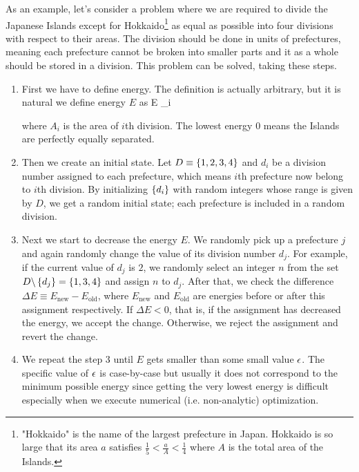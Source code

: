 \documentclass{article}
\theoremstyle{definition}
\begin{document}
As an example, let's consider a problem where we are required to divide the Japanese Islands except for Hokkaido\footnote{"Hokkaido" is the name of the largest prefecture in Japan. Hokkaido is so large that its area $a$ satisfies $\frac{1}{5} < \frac{a}{A} < \frac{1}{4}$ where $A$ is the total area of the Islands.} as equal as possible into four divisions with respect to their areas. The division should be done in units of prefectures, meaning each prefecture cannot be broken into smaller parts and it as a whole should be stored in a division. This problem can be solved, taking these steps.
\begin{enumerate}

\item
First we have to define energy. The definition is actually arbitrary, but it is natural we define energy $E$ as
\begineq
E \equiv \sum _i  
\edeq

where $A_i$ is the area of $i$th division. The lowest energy $0$ means the Islands are perfectly equally separated.

\item
Then we create an initial state. Let $D \equiv \left\{ 1, 2, 3, 4 \right\}$ and $d_i$ be a division number assigned to each prefecture, which means $i$th prefecture now belong to $i$th division. By initializing $\left\{ d_i \right\}$ with random integers whose range is given by $D$, we get a random initial state; each prefecture is included in a random division.

\item
Next we start to decrease the energy $E$. We randomly pick up a prefecture $j$ and again randomly change the value of its division number $d_j$. For example, if the current value of $d_j$ is $2$, we randomly select an integer $n$ from the set $D \backslash \left\{ d_j \right\} = \left\{ 1, 3, 4 \right\}$ and assign $n$ to $d_j$. After that, we check the difference $\Delta E \equiv E_\text{new} - E_\text{old}$, where $E_\text{new}$ and $E_\text{old}$ are energies before or after this assignment respectively. If $\Delta E < 0$, that is, if the assignment has decreased the energy, we accept the change. Otherwise, we reject the assignment and revert the change.

\item
We repeat the step 3 until $E$ gets smaller than some small value $\epsilon$. The specific value of $\epsilon$ is case-by-case but usually it does not correspond to the minimum possible energy since getting the very lowest energy is difficult especially when we execute numerical (i.e. non-analytic) optimization.

\end{enumerate}
\end{document}
